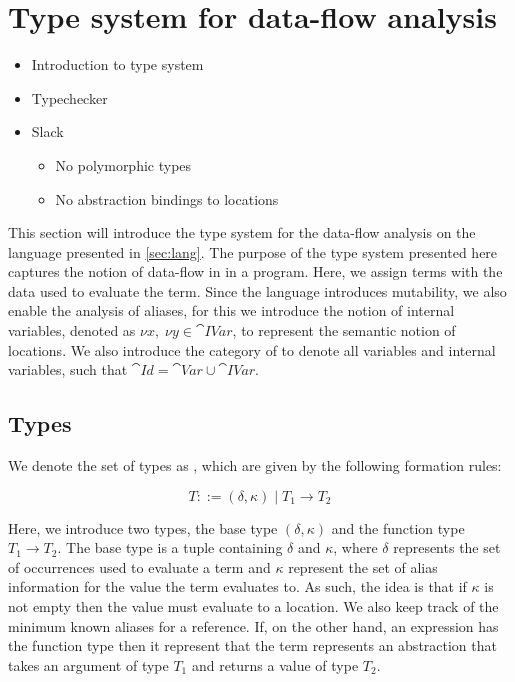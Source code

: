 \documentclass[../../master.tex]{subfiles}
\begin{document}
\section{Type system for data-flow analysis}\label{sec:TypeSys}
\begin{itemize}
	\item Introduction to type system
	\item Typechecker
	\item Slack
	\begin{itemize}
		\item No polymorphic types
		\item No abstraction bindings to locations
	\end{itemize}
\end{itemize}
This section will introduce the type system for the data-flow analysis on the language presented in \cref{sec:lang}.
The purpose of the type system presented here captures the notion of data-flow in in a program.
Here, we assign terms with the data used to evaluate the term.
Since the language introduces mutability, we also enable the analysis of aliases, for this we introduce the notion of internal variables, denoted as $\nu x,\; \nu y\in\cat{IVar}$, to represent the semantic notion of locations.
We also introduce the category of  to denote all variables and internal variables, such that $\cat{Id}=\cat{Var}\cup\cat{IVar}$.

\subsection{Types}
We denote the set of types as , which are given by the following formation rules:

$$T::=(\delta,\kappa)\mid T_1 \rightarrow T_2$$

Here, we introduce two types, the base type $(\delta,\kappa)$ and the function type $T_1 \rightarrow T_2$.
The base type is a tuple containing $\delta$ and $\kappa$, where $\delta$ represents the set of occurrences used to evaluate a term and $\kappa$ represent the set of alias information for the value the term evaluates to.
As such, the idea is that if $\kappa$ is not empty then the value must evaluate to a location.
We also keep track of the minimum known aliases for a reference.
If, on the other hand, an expression has the function type then it represent that the term represents an abstraction that takes an argument of type $T_1$ and returns a value of type $T_2$.
\end{document}
